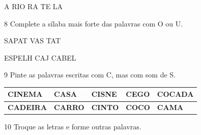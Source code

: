 \begin{center}
A  RIO \hspace{2cm} RA  TE \hspace{2cm}  LA
\end{center}

\num{8} Complete a sílaba mais forte das palavras com O ou U.

\vspace*{+2em}


SAPAT  \hspace{1cm} VAS  \hspace{2cm} TAT 
\vspace{-1em}

ESPELH  \hspace{1cm} CAJ  \hspace{2cm} CABEL 

\num{9} Pinte as palavras escritas com C, mas com som de S.

\vspace*{+1em}


\begin{longtable}[]{@{}lllll@{}}
\toprule
\textbf{CINEMA} & \textbf{CASA} & \textbf{CISNE} & \textbf{CEGO} &
\textbf{COCADA}\tabularnewline
\midrule
\endhead
\textbf{CADEIRA} & \textbf{CARRO} & \textbf{CINTO } & \textbf{COCO} &
\textbf{CAMA}\tabularnewline
\bottomrule
\end{longtable}

\num{10} Troque as letras e forme outras palavras.


